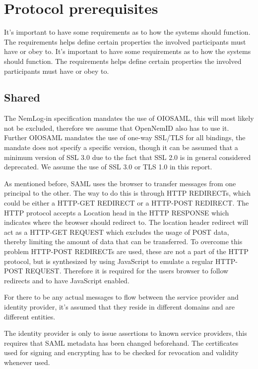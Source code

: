 \documentclass[twosided]{report}
\begin{document}
\section{Protocol prerequisites}
It's important to have some requirements as to how the systems should function. The requirements helps define certain properties the involved participants must have or obey to.
It's important to have some requirements as to how the systems should function. The requirements helps define certain properties the involved participants must have or obey to.

\subsection{Shared}
The NemLog-in specification mandates the use of OIOSAML, this will most likely not be excluded, therefore we assume that OpenNemID also has to use it. Further OIOSAML mandates the use of one-way SSL/TLS for all bindings, the mandate does not specify a specific version, though it can be assumed that a minimum version of SSL 3.0 due to the fact that SSL 2.0 is in general considered deprecated. We assume the use of SSL 3.0 or TLS 1.0 in this report.
\par
As mentioned before, SAML uses the browser to transfer messages from one principal to the other. The way to do this is through HTTP REDIRECTs, which could be either a HTTP-GET REDIRECT or a HTTP-POST REDIRECT. The HTTP protocol accepts a Location head in the HTTP RESPONSE which indicates where the browser should redirect to. The location header redirect will act as a HTTP-GET REQUEST which excludes the usage of POST data, thereby limiting the amount of data that can be transferred. To overcome this problem HTTP-POST REDIRECTs are used, these are not a part of the HTTP protocol, but is synthesized by using JavaScript to emulate a regular HTTP-POST REQUEST. Therefore it is required for the users browser to follow redirects and to have JavaScript enabled.
\par
For there to be any actual messages to flow between the service provider and identity provider, it's assumed that they reside in different domains and are different entities.
\par
The identity provider is only to issue assertions to known service providers, this requires that SAML metadata has been changed beforehand. The certificates used for signing and encrypting has to be checked for revocation and validity whenever used.
\\
\par
\end{document}
